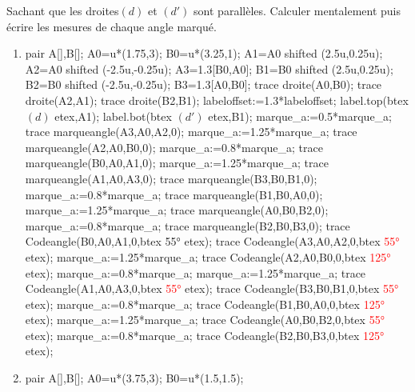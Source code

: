 \begin{corrige}
   Sachant que les droites$(d)$ et $(d')$ sont parallèles. Calculer mentalement puis écrire les mesures de chaque angle marqué.
   \begin{enumerate}
     \item \phantom{rrr}
     \begin{Geometrie}[CoinHD={(6u,4u)}]
         pair A[],B[];
         A0=u*(1.75,3);
         B0=u*(3.25,1);
         A1=A0 shifted (2.5u,0.25u);
         A2=A0 shifted (-2.5u,-0.25u);
         A3=1.3[B0,A0];
         B1=B0 shifted (2.5u,0.25u);
         B2=B0 shifted (-2.5u,-0.25u);
         B3=1.3[A0,B0];
         trace droite(A0,B0);
         trace droite(A2,A1);
         trace droite(B2,B1);
         labeloffset:=1.3*labeloffset;
         label.top(btex $(d)$ etex,A1);
         label.bot(btex $(d')$ etex,B1);         
         marque_a:=0.5*marque_a;
         trace marqueangle(A3,A0,A2,0);
         marque_a:=1.25*marque_a;
         trace marqueangle(A2,A0,B0,0);
         marque_a:=0.8*marque_a;
         trace marqueangle(B0,A0,A1,0);
         marque_a:=1.25*marque_a;
         trace marqueangle(A1,A0,A3,0);
         trace marqueangle(B3,B0,B1,0);
         marque_a:=0.8*marque_a;
         trace marqueangle(B1,B0,A0,0);
         marque_a:=1.25*marque_a;
         trace marqueangle(A0,B0,B2,0);
         marque_a:=0.8*marque_a;
         trace marqueangle(B2,B0,B3,0);
         trace Codeangle(B0,A0,A1,0,btex \ang{55} etex);
         trace Codeangle(A3,A0,A2,0,btex \textcolor{red}{\ang{55}} etex);
         marque_a:=1.25*marque_a;
         trace Codeangle(A2,A0,B0,0,btex \textcolor{red}{\ang{125}} etex);
         marque_a:=0.8*marque_a;
         marque_a:=1.25*marque_a;
         trace Codeangle(A1,A0,A3,0,btex \textcolor{red}{\ang{55}} etex);
         trace Codeangle(B3,B0,B1,0,btex \textcolor{red}{\ang{55}} etex);
         marque_a:=0.8*marque_a;
         trace Codeangle(B1,B0,A0,0,btex \textcolor{red}{\ang{125}} etex);
         marque_a:=1.25*marque_a;
         trace Codeangle(A0,B0,B2,0,btex \textcolor{red}{\ang{55}} etex);
         marque_a:=0.8*marque_a;
         trace Codeangle(B2,B0,B3,0,btex \textcolor{red}{\ang{125}} etex);         
      \end{Geometrie}
      \item \phantom{rrr}
      \begin{Geometrie}[CoinHD={(7u,4u)}]
         pair A[],B[];
         A0=u*(3.75,3);
         B0=u*(1.5,1.5);

\end{Geometrie}
\end{enumerate}
\end{corrige}
